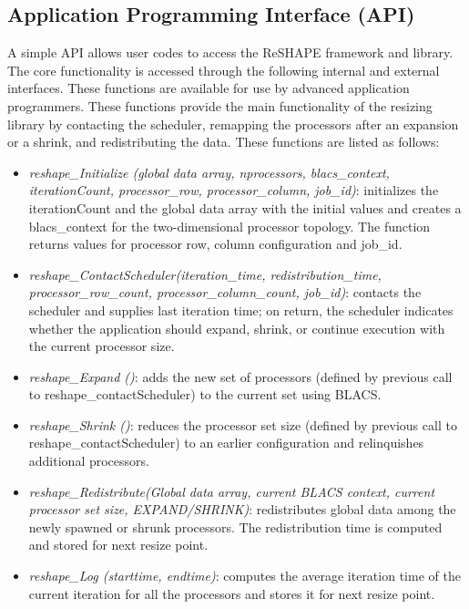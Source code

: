 \documentclass[letterpaper]{llncs}
\newcommand{\reshape}{ReSHAPE}
\begin{document}
\subsection {Application Programming Interface (API)}
A simple API allows user codes to access the \reshape{} framework and library. The core functionality is accessed through the following internal and external interfaces.
These functions are available for use by advanced application programmers. These functions provide the main functionality of the resizing library by contacting the scheduler, remapping the processors after an expansion or a shrink, and redistributing the data. These functions are listed as follows:
\begin {itemize}
\item   \textit{reshape\_Initialize (global data array, nprocessors, blacs\_context, iterationCount, processor\_row, \-processor\_\-column, job\_id)}: initializes the iterationCount and the global data array with the initial values and creates  a blacs\_context for the two-dimensional processor topology. The function returns values for processor row, column configuration and job\_id.
\item    \textit{reshape\_ContactScheduler(iteration\_time, redistribution\_time, processor\_row\_}\textit{\-count, \-processor\-\_column\-\_count, \-job\_id)}:
 contacts the scheduler and supplies last iteration time; on  return, the scheduler indicates whether the application should expand, shrink, or continue execution with the current processor size.
\item    \textit{reshape\_Expand ()}: adds the new set of processors (defined by previous call to reshape\_contactScheduler) to the current set using BLACS.
\item    \textit{reshape\_Shrink ()}: reduces the processor set size (defined by previous call to reshape\_contactScheduler) to an earlier configuration and relinquishes additional processors.
\item   \textit{reshape\_Redistribute(Global data array, current BLACS context, current processor set size, EXPAND/SHRINK)}:  redistributes global data among the newly spawned or shrunk processors. The redistribution time is computed and stored for next resize point.
\item \textit{reshape\_Log (starttime, endtime)}: computes the average iteration time of the current iteration for all the processors and stores it for next resize point.
\end{itemize}
\end{document}
